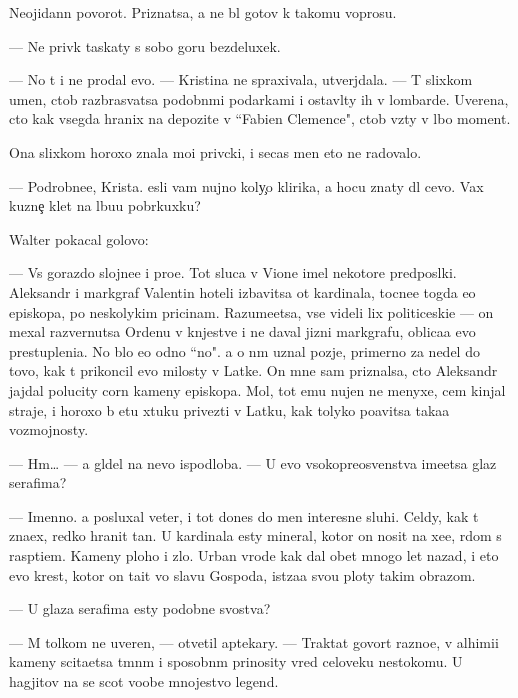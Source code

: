 \documentclass[10pt]{book}
\begin{document}
Neojidann{\yi}{\y} povorot. Priznatsa, {\y}a ne b{\yi}l gotov k takomu voprosu.

— Ne priv{\yi}k taskaty s sobo{\y} goru bezdeluxek.

— No t{\yi} i ne prodal {\y}evo. — Kristina ne spraxivala, utverjdala. — T{\yi} slixkom umen, ctob{\yi} razbras{\yi}vatsa podobn{\yi}mi podarkami i ostavl{\ia}ty ih v lombarde. Uverena, cto kak vsegda hranix na depozite v ``Fabien Clemence", ctob{\yi} vz{\ia}ty v l{\iu}bo{\y} moment.

Ona slixkom horoxo znala mo{\y}i priv{\yi}cki, i se{\y}cas men{\ia} eto ne radovalo.

— Podrobne{\y}e, Krista. {\Y}esli vam nujno koly{\c}o klirika, {\y}a hocu znaty dl{\ia} cevo. Vax kuzne{\c} kl{\iu}{\y}et na l{\iu}bu{\y}u pobr{\ia}kuxku?

Walter pokacal golovo{\y}:

— Vs{\e} gorazdo slojne{\y}e i pro{\x}e. Tot sluca{\y} v Vione imel nekotor{\yi}{\y}e predpos{\yi}lki. Aleksandr i markgraf Valentin hoteli izbavitsa ot kardinala, tocne{\y}e togda {\y}e{\x}o {\y}episkopa, po neskolykim pricinam. Razume{\y}etsa, vse videli lix politiceski{\y}e — on mexal razvernutsa Ordenu v kn{\ia}jestve i ne daval jizni markgrafu, oblica{\y}a {\y}evo prestupleni{\y}a. No b{\yi}lo {\y}e{\x}o odno ``no". {\Y}a o n{\e}m uznal pozje, primerno za nedel{\iu} do tovo, kak t{\yi} prikoncil {\y}evo milosty v Latke. On mne sam priznalsa, cto Aleksandr jajdal polucity corn{\yi}{\y} kameny {\y}episkopa. Mol, tot {\y}emu nujen ne menyxe, cem kinjal{\yi} straje{\y}, i horoxo b{\yi} etu xtuku privezti v Latku, kak tolyko po{\y}avitsa taka{\y}a vozmojnosty.

— Hm… — {\Y}a gl{\ia}del na nevo ispodlob{\y}a. — U {\y}evo v{\yi}sokopreosv{\ia}{\x}enstva ime{\y}etsa glaz serafima?

— Imenno. {\Y}a posluxal veter, i tot dones do men{\ia} interesn{\yi}{\y}e sluhi. Cel{\ia}dy, kak t{\yi} zna{\y}ex, redko hranit ta{\y}n{\yi}. U kardinala {\y}esty mineral, kotor{\yi}{\y} on nosit na xe{\y}e, r{\ia}dom s rasp{\ia}ti{\y}em. Kameny ploho{\y} i zlo{\y}. Urban vrode kak dal obet mnogo let nazad, i eto {\y}evo krest, kotor{\yi}{\y} on ta{\x}it vo slavu Gospoda, ist{\ia}za{\y}a svo{\y}u ploty takim obrazom.

— U glaza serafima {\y}esty podobn{\yi}{\y}e svo{\y}stva?

— M{\yi} tolkom ne uveren{\yi}, — otvetil aptekary. — Traktat{\yi} govor{\ia}t razno{\y}e, v alhimi{\y}i kameny scita{\y}etsa t{\e}mn{\yi}m i sposobn{\yi}m prinosity vred celoveku nesto{\y}komu. U hagjitov na se{\y} scot voob{\x}e mnojestvo legend.
\end{document}

